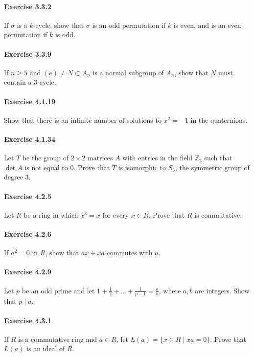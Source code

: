 \documentclass{article}
\begin{document}
\paragraph{Exercise 3.3.2} If $\sigma$ is a $k$-cycle, show that $\sigma$ is an odd permutation if $k$ is even, and is an even permutation if $k$ is odd.

\paragraph{Exercise 3.3.9} If $n \geq 5$ and $(e) \neq N \subset A_n$ is a normal subgroup of $A_n$, show that $N$ must contain a 3-cycle.

\paragraph{Exercise 4.1.19} Show that there is an infinite number of solutions to $x^2 = -1$ in the quaternions.

\paragraph{Exercise 4.1.34} Let $T$ be the group of $2\times 2$ matrices $A$ with entries in the field $\mathbb{Z}_2$ such that $\det A$ is not equal to 0. Prove that $T$ is isomorphic to $S_3$, the symmetric group of degree 3.

\paragraph{Exercise 4.2.5} Let $R$ be a ring in which $x^3 = x$ for every $x \in R$. Prove that $R$ is commutative.

\paragraph{Exercise 4.2.6} If $a^2 = 0$ in $R$, show that $ax + xa$ commutes with $a$.

\paragraph{Exercise 4.2.9} Let $p$ be an odd prime and let $1 + \frac{1}{2} + ... + \frac{1}{p - 1} = \frac{a}{b}$, where $a, b$ are integers. Show that $p \mid a$.

\paragraph{Exercise 4.3.1} If $R$ is a commutative ring and $a \in R$, let $L(a) = \{x \in R \mid xa = 0\}$. Prove that $L(a)$ is an ideal of $R$.
\end{document}
